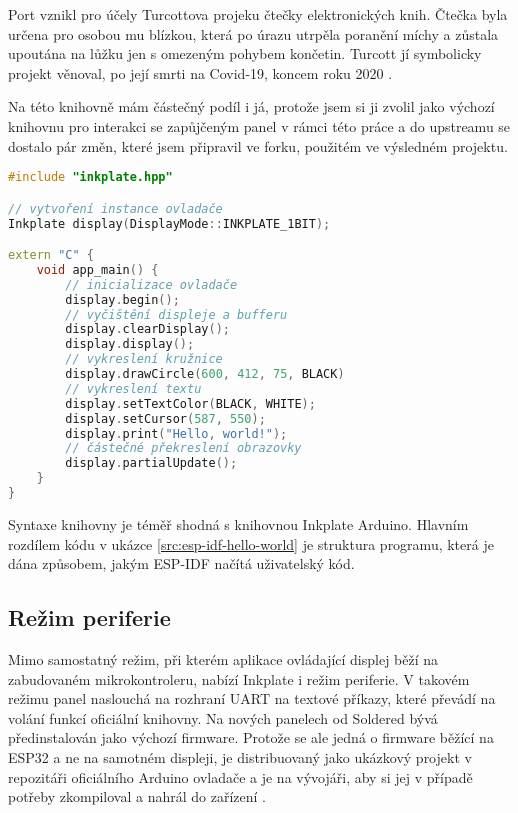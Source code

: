 Port vznikl pro účely Turcottova projeku čtečky elektronických knih. Čtečka byla určena pro osobou mu blízkou, která po úrazu utrpěla poranění míchy a zůstala upoutána na lůžku jen s omezeným pohybem končetin. Turcott jí symbolicky projekt věnoval, po její smrti na Covid-19, koncem roku 2020 \cite{turcotteTurgu1EPubInkPlate2024}.

Na této knihovně mám částečný podíl i já, protože jsem si ji zvolil jako výchozí knihovnu pro interakci se zapůjčeným panel v rámci této práce a do upstreamu se dostalo pár změn, které jsem připravil ve forku, použitém ve výsledném projektu.

\begin{lstlisting}[label=src:esp-idf-hello-world,language=C++,caption={Ilustrační použití knihovny Inkplate ESP-IDF}]
#include "inkplate.hpp"

// vytvoření instance ovladače
Inkplate display(DisplayMode::INKPLATE_1BIT);

extern "C" {
    void app_main() {
        // inicializace ovladače
        display.begin();
        // vyčištění displeje a bufferu
        display.clearDisplay();
        display.display();
        // vykreslení kružnice
        display.drawCircle(600, 412, 75, BLACK)
        // vykreslení textu
        display.setTextColor(BLACK, WHITE);
        display.setCursor(587, 550);
        display.print("Hello, world!");
        // částečné překreslení obrazovky
        display.partialUpdate();
    }
}
\end{lstlisting}

Syntaxe knihovny je téměř shodná s knihovnou Inkplate Arduino. Hlavním rozdílem kódu v ukázce \ref{src:esp-idf-hello-world} je struktura programu, která je dána způsobem, jakým ESP-IDF načítá uživatelský kód.

\subsection{Režim periferie}
Mimo samostatný režim, při kterém aplikace ovládající displej běží na zabudovaném mikrokontroleru, nabízí Inkplate i režim periferie. V takovém režimu panel naslouchá na rozhraní UART na textové příkazy, které převádí na volání funkcí oficiální knihovny. Na nových panelech od Soldered bývá předinstalován jako výchozí firmware. Protože se ale jedná o firmware běžící na ESP32 a ne na samotném displeji, je distribuovaný jako ukázkový projekt v repozitáři oficiálního Arduino ovladače a je na vývojáři, aby si jej v případě potřeby zkompiloval a nahrál do zařízení \cite{SolderedElectronicsInkplatePeripheralModeRaspberryPiExample2023}.

